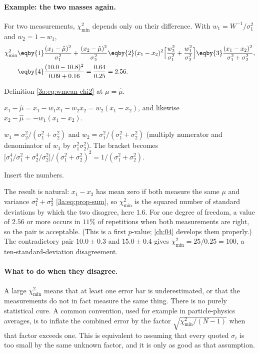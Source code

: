 \paragraph{Example: the two masses again.}
For two measurements, $\chi^2_{\min}$ depends only on their difference.
With $w_1=W^{-1}/\sigma_1^2$ and $w_2=1-w_1$,
\begin{align*}
  \chi^2_{\min}
  &\eqby{1}\frac{(x_1-\hat\mu)^2}{\sigma_1^2}+\frac{(x_2-\hat\mu)^2}{\sigma_2^2}
  \eqby{2}(x_1-x_2)^2\Bigl[\frac{w_2^2}{\sigma_1^2}+\frac{w_1^2}{\sigma_2^2}\Bigr]
  \eqby{3}\frac{(x_1-x_2)^2}{\sigma_1^2+\sigma_2^2},\\
  &\eqby{4}\frac{(10.0-10.8)^2}{0.09+0.16}=\frac{0.64}{0.25}=2.56 .
\end{align*}
\begin{explain}
  \item Definition \eqref{3a:eq:wmean-chi2} at $\mu=\hat\mu$.
  \item $x_1-\hat\mu=x_1-w_1x_1-w_2x_2=w_2(x_1-x_2)$, and likewise
        $x_2-\hat\mu=-w_1(x_1-x_2)$.
  \item $w_1=\sigma_2^2/(\sigma_1^2+\sigma_2^2)$ and
        $w_2=\sigma_1^2/(\sigma_1^2+\sigma_2^2)$ (multiply numerator and
        denominator of $w_1$ by $\sigma_1^2\sigma_2^2$). The bracket becomes
        $\bigl[\sigma_1^4/\sigma_1^2+\sigma_2^4/\sigma_2^2\bigr]/(\sigma_1^2+\sigma_2^2)^2
        =1/(\sigma_1^2+\sigma_2^2)$.
  \item Insert the numbers.
\end{explain}
The result is natural: $x_1-x_2$ has mean zero if both measure the same
$\mu$ and variance $\sigma_1^2+\sigma_2^2$ \eqref{3a:eq:prop-sum}, so
$\chi^2_{\min}$ is the squared number of standard deviations by which the two
disagree, here $1.6$. For one degree of freedom, a value of $2.56$ or more
occurs in $11\%$ of repetitions when both measurements are right, so the pair
is acceptable. (This is a first $p$-value; \cref{ch:04} develops them
properly.) The contradictory pair $10.0\pm0.3$ and $15.0\pm0.4$ gives
$\chi^2_{\min}=25/0.25=100$, a ten-standard-deviation disagreement.

\paragraph{What to do when they disagree.}
A large $\chi^2_{\min}$ means that at least one error bar is underestimated,
or that the measurements do not in fact measure the same thing. There is no
purely statistical cure. A common convention, used for example in
particle-physics averages, is to inflate the combined error by the factor
$\sqrt{\chi^2_{\min}/(N-1)}$ when that factor exceeds one. This is
equivalent to assuming that every quoted $\sigma_i$ is too small by the same
unknown factor, and it is only as good as that assumption.

